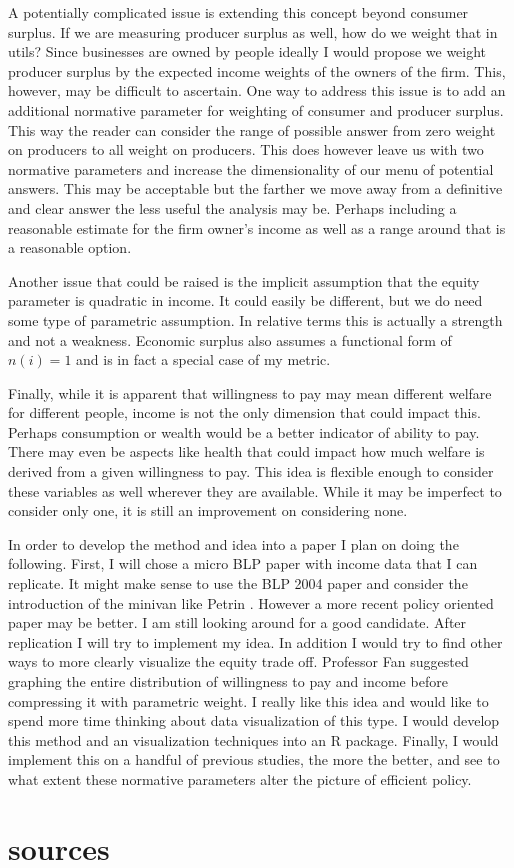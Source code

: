 \documentclass[11pt]{article}
\begin{document}
A potentially complicated issue is extending this concept beyond consumer surplus. If we are measuring producer surplus as well, how do we weight that in utils? Since businesses are owned by people ideally I would propose we weight producer surplus by the expected income weights of the owners of the firm. This, however, may be difficult to ascertain. One way to address this issue is to add an additional normative parameter for weighting of consumer and producer surplus. This way the reader can consider the range of possible answer from zero weight on producers to all weight on producers. This does however leave us with two normative parameters and increase the dimensionality of our menu of potential answers. This may be acceptable but the farther we move away from a definitive and clear answer the less useful the analysis may be. Perhaps including a reasonable estimate for the firm owner's income as well as a range around that is a reasonable option. 

Another issue that could be raised is the implicit assumption that the equity parameter is quadratic in income. It could easily be different, but we do need some type of parametric assumption. In relative terms this is actually a strength and not a weakness. Economic surplus also assumes a functional form of $ n(i) = 1$ and is in fact a special case of my metric.
 
Finally, while it is apparent that willingness to pay may mean different welfare for different people, income is not the only dimension that could impact this. Perhaps consumption or wealth would be a better indicator of ability to pay. There may even be aspects like health that could impact how much welfare is derived from a given willingness to pay. This idea is flexible enough to consider these variables as well wherever they are available. While it may be imperfect to consider only one, it is still an improvement on considering none. 

In order to develop the method and idea into a paper I plan on doing the following. First, I will chose a micro BLP paper with income data that I can replicate. It might make sense to use the BLP 2004 paper and consider the introduction of the minivan like Petrin \cite{Berry2004} \cite{Petrin2002}. However a more recent policy oriented paper may be better. I am still looking around for a good candidate. After replication I will try to implement my idea. In addition I would try to find other ways to more clearly visualize the equity trade off. Professor Fan suggested graphing the entire distribution of willingness to pay and income before compressing it with parametric weight. I really like this idea and would like to spend more time thinking about data visualization of this type. I would develop this method and an visualization techniques into an R package. Finally,  I would implement this on a handful of previous studies, the more the better, and see to what extent these normative parameters alter the picture of efficient policy. 


\section{sources}




\end{document}
